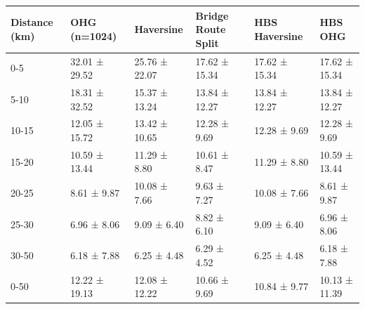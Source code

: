 \begin{tabular}{llllll}
\toprule
Distance (km) & OHG (n=1024) & Haversine & Bridge Route Split & HBS Haversine & HBS OHG \\
\midrule
0-5 & 32.01 ± 29.52 & 25.76 ± 22.07 & 17.62 ± 15.34 & 17.62 ± 15.34 & 17.62 ± 15.34 \\
5-10 & 18.31 ± 32.52 & 15.37 ± 13.24 & 13.84 ± 12.27 & 13.84 ± 12.27 & 13.84 ± 12.27 \\
10-15 & 12.05 ± 15.72 & 13.42 ± 10.65 & 12.28 ± 9.69 & 12.28 ± 9.69 & 12.28 ± 9.69 \\
15-20 & 10.59 ± 13.44 & 11.29 ± 8.80 & 10.61 ± 8.47 & 11.29 ± 8.80 & 10.59 ± 13.44 \\
20-25 & 8.61 ± 9.87 & 10.08 ± 7.66 & 9.63 ± 7.27 & 10.08 ± 7.66 & 8.61 ± 9.87 \\
25-30 & 6.96 ± 8.06 & 9.09 ± 6.40 & 8.82 ± 6.10 & 9.09 ± 6.40 & 6.96 ± 8.06 \\
30-50 & 6.18 ± 7.88 & 6.25 ± 4.48 & 6.29 ± 4.52 & 6.25 ± 4.48 & 6.18 ± 7.88 \\
0-50 & 12.22 ± 19.13 & 12.08 ± 12.22 & 10.66 ± 9.69 & 10.84 ± 9.77 & 10.13 ± 11.39 \\
\bottomrule
\end{tabular}
